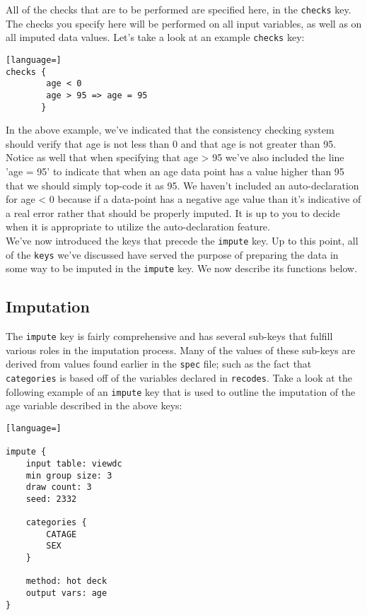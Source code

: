 \documentclass{article}
\begin{document}
All of the checks that are to be performed are specified here, in the {\tt checks} key. 
The checks you specify here will be performed on all input variables, as well as on all 
imputed data values. Let's take a look at an example {\tt checks} key:

\begin{lstlisting}[language=]
checks {
    	age < 0
        age > 95 => age = 95
       }
\end{lstlisting}

In the above example, we've indicated that the consistency checking system should verify that 
age is not less than 0 and that age is not greater than 95. Notice as well that when specifying 
that age > 95 we've also included the line 'age = 95' to indicate that when an age data point has 
a value higher than 95 that we should simply top-code it as 95. We haven't included an auto-declaration 
for age < 0 because if a data-point has a negative age value than it's indicative of a real error rather 
that should be properly imputed. It is up to you to decide when it is appropriate to utilize the 
auto-declaration feature.\\

We've now introduced the keys that precede the {\tt impute} key. Up to this point, all of the {\tt keys} 
we've discussed have served the purpose of preparing the data in some way to be imputed in the 
{\tt impute} key. We now describe its functions below.


\subsection{Imputation} \label{imputesec}
The {\tt impute} key is fairly comprehensive and has several sub-keys that fulfill various 
roles in the imputation process. Many of the values of these sub-keys are derived from values 
found earlier in the {\tt spec} file; such as the fact that {\tt categories} is based off of 
the variables declared in {\tt recodes}. Take a look at the following example of an {\tt impute} key 
that is used to outline the imputation of the age variable described in the above keys:

\begin{lstlisting}[language=]

impute {
    input table: viewdc
    min group size: 3
    draw count: 3
    seed: 2332

    categories {
        CATAGE
        SEX
    }

    method: hot deck
    output vars: age
}


\end{lstlisting}
\end{document}
